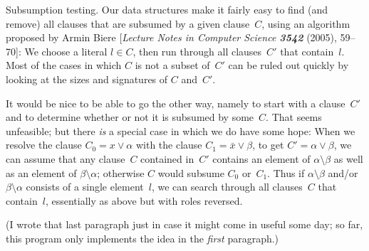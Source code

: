 Subsumption testing. Our data structures make it fairly
easy to find (and remove) all clauses that are subsumed by a
given clause~$C$, using an algorithm proposed by Armin Biere
[{\sl Lecture Notes in Computer Science\/ \bf3542} (2005), 59--70]:
We choose a literal $l\in C$, then run through
all clauses~$C'$ that contain~$l$. Most of the cases in which
$C$ is not a subset of~$C'$ can be ruled out quickly by looking
at the sizes and signatures of $C$ and~$C'$.

It would be nice to be able to go the other way, namely to start with a
clause~$C'$ and to determine whether or not it is subsumed by some~$C$.
That seems unfeasible; but there {\it is\/} a special case in which we do
have some hope: When we resolve the clause $C_0=x\lor\alpha$
with the clause $C_1=\bar x\lor\beta$, to get $C'=\alpha\lor\beta$, we
can assume that any clause~$C$ contained in~$C'$ contains an element
of $\alpha\setminus\beta$ as well as an element of $\beta\setminus\alpha$;
otherwise $C$ would subsume $C_0$ or~$C_1$. Thus if $\alpha\setminus\beta$
and/or $\beta\setminus\alpha$ consists of a single element~$l$, we can
search through all clauses~$C$ that contain~$l$, essentially as above
but with roles reversed.

(I wrote that last paragraph just in case it might come in useful some day;
so far, this program only implements the idea in the {\it first\/} paragraph.)

